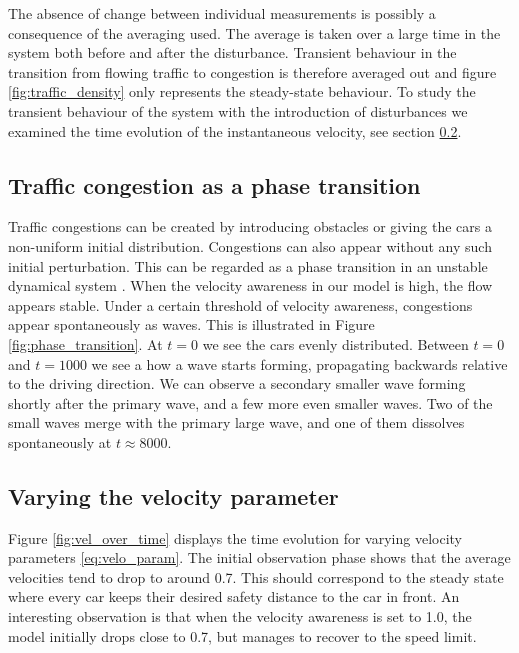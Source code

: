 \documentclass[11pt,a4paper,twocolumn]{article}
\begin{document}
 The absence of change between individual measurements is possibly a consequence of the averaging used. The average is taken over a large time in the system both before and after the disturbance. Transient behaviour in the transition from flowing traffic to congestion is therefore averaged out and figure \ref{fig:traffic_density} only represents the steady-state behaviour. To study the transient behaviour of the system with the introduction of disturbances we examined the time evolution of the instantaneous velocity, see section \ref{sec:vel_param}. 

\subsection{Traffic congestion as a phase transition} \label{sec:phase}
Traffic congestions can be created by introducing obstacles or giving the cars a non-uniform initial distribution. Congestions can also appear without any such initial perturbation. This can be regarded as a phase transition in an unstable dynamical system \cite{bando1995dynamical}. When the velocity awareness in our model is high, the flow appears stable. Under a certain threshold of velocity awareness, congestions appear spontaneously as waves. This is illustrated in Figure \ref{fig:phase_transition}. At $t=0$ we see the cars evenly distributed. Between $t=0$ and $t=1000$ we see a how a wave starts forming, propagating backwards relative to the driving direction. We can observe a secondary smaller wave forming shortly after the primary wave, and a few more even smaller waves. Two of the small waves merge with the primary large wave, and one of them dissolves spontaneously at $t \approx 8000$. 

\subsection{Varying the velocity parameter}\label{sec:vel_param}
Figure \ref{fig:vel_over_time} displays the time evolution for varying velocity parameters \eqref{eq:velo_param}. The initial observation phase shows that the average velocities tend to drop to around 0.7.
This should correspond to the steady state where every car keeps their desired safety distance to the car in front.%
An interesting observation is that when the velocity awareness is set to 1.0, the model initially drops close to 0.7, but manages to recover to the speed limit. %
\end{document}
